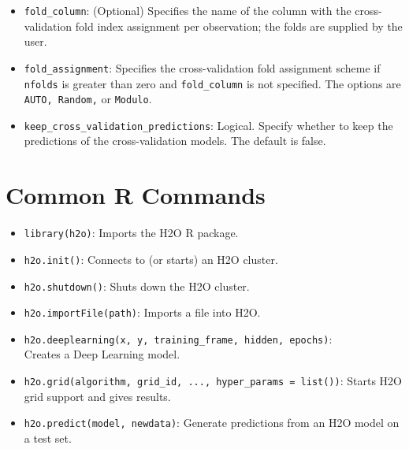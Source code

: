 {{{\begin{itemize}
\item \texttt{fold\_column}: (Optional) Specifies the name of the column with the cross-validation fold index assignment per observation; the folds are supplied by the user. 

\item \texttt{fold\_assignment}: Specifies the cross-validation fold assignment scheme if \texttt{nfolds} is greater than zero and \texttt{fold\_column} is not specified. The options are \texttt{AUTO, Random,} or \texttt{Modulo}. 

\item \texttt{keep\_cross\_validation\_predictions}: Logical.  Specify whether to keep the predictions of the cross-validation models.  The default is false.

\end{itemize}

\section{Common R Commands}
\begin{itemize}

\item \texttt{library(h2o)}: Imports the H2O R package.

\item \texttt{h2o.init()}:  Connects to (or starts) an H2O cluster.

\item \texttt{h2o.shutdown()}: Shuts down the H2O cluster.

\item \texttt{h2o.importFile(path)}: Imports a file into H2O.

\item \texttt{h2o.deeplearning(x, y, training\_frame, hidden, epochs)}:\\ Creates a Deep Learning model.

\item \texttt{h2o.grid(algorithm, grid\_id, ..., hyper\_params = list())}: Starts H2O grid support and gives results.

\item \texttt{h2o.predict(model, newdata)}: Generate predictions from an H2O model on a test set.

\end{itemize}

\newpage
}}}
